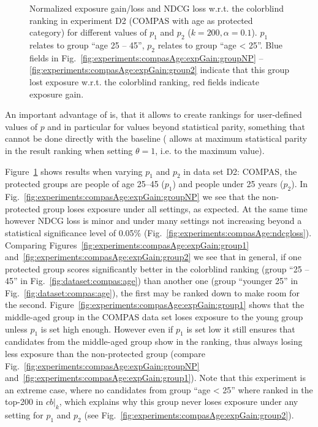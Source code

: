 \begin{figure}[t!]
	\vspace{-3mm}
	\caption{Normalized exposure gain/loss and NDCG loss w.r.t. the colorblind ranking in experiment D2 (COMPAS with age as protected category) for different values of $p_1$ and $p_2$ ($k=200, \alpha=0.1$).
		$p_1$ relates to group ``age 25 -- 45'', $p_2$ relates to group ``age < 25''.
		Blue fields in Fig.~\ref{fig:experiments:compasAge:expGain:groupNP} -- \ref{fig:experiments:compasAge:expGain:group2} indicate that this group lost exposure w.r.t. the colorblind ranking, red fields indicate exposure gain.
	}
	\label{fig:results-moving-p}
\end{figure}

%
An important advantage of \algoFAIR is, that it allows to create rankings for user-defined values of $p$ and in particular for values beyond statistical parity, something that cannot be done directly with the baseline (\citet{zehlike2020matching} allows at maximum statistical parity in the result ranking when setting $\theta=1$, i.e. to the maximum value).

Figure~\ref{fig:results-moving-p} shows results when varying $p_1$ and $p_2$ in data set D2: COMPAS, the protected groups are people of age 25--45 ($p_1$) and people under 25 years ($p_2$).
%
In Fig.~\ref{fig:experiments:compasAge:expGain:groupNP} we see that the non-protected group loses exposure under all settings, as expected.
%
At the same time however NDCG loss is minor and under many settings not increasing beyond a statistical significance level of 0.05\% (Fig.~\ref{fig:experiments:compasAge:ndcgloss}).
%
Comparing Figures~\ref{fig:experiments:compasAge:expGain:group1} and~\ref{fig:experiments:compasAge:expGain:group2} we see that in general, if one protected group scores significantly better in the colorblind ranking (group ``25 -- 45'' in Fig.~\ref{fig:dataset:compas:age}) than another one (group ``younger 25'' in Fig.~\ref{fig:dataset:compas:age}), the first may be ranked down to make room for the second.
%
Figure~\ref{fig:experiments:compasAge:expGain:group1} shows that the middle-aged group in the COMPAS data set loses exposure to the young group unless $p_1$ is set high enough.
%
However even if $p_1$ is set low it still ensures that candidates from the middle-aged group show in the ranking, thus always losing less exposure than the non-protected group (compare Fig.~\ref{fig:experiments:compasAge:expGain:groupNP} and~\ref{fig:experiments:compasAge:expGain:group1}).
%
Note that this experiment is an extreme case, where no candidates from group ``age < 25'' where ranked in the top-200 in $cb|_k$, which explains why this group never loses exposure under any setting for $p_1$ and $p_2$ (see Fig.~\ref{fig:experiments:compasAge:expGain:group2}).

